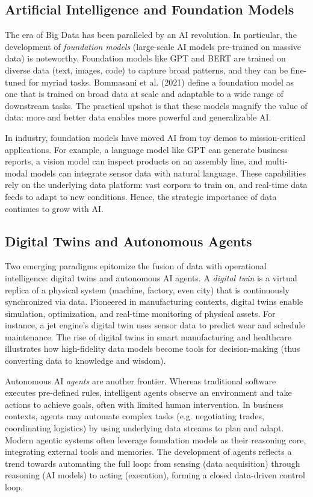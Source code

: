 \subsection{Artificial Intelligence and Foundation Models}
The era of Big Data has been paralleled by an AI revolution. In particular, the development of \emph{foundation models} (large-scale AI models pre-trained on massive data) is noteworthy. Foundation models like GPT and BERT are trained on diverse data (text, images, code) to capture broad patterns, and they can be fine-tuned for myriad tasks. Bommasani et al. (2021) define a foundation model as one that is trained on broad data at scale and adaptable to a wide range of downstream tasks. The practical upshot is that these models magnify the value of data: more and better data enables more powerful and generalizable AI.

In industry, foundation models have moved AI from toy demos to mission-critical applications. For example, a language model like GPT can generate business reports, a vision model can inspect products on an assembly line, and multi-modal models can integrate sensor data with natural language. These capabilities rely on the underlying data platform: vast corpora to train on, and real-time data feeds to adapt to new conditions. Hence, the strategic importance of data continues to grow with AI.

\subsection{Digital Twins and Autonomous Agents}
Two emerging paradigms epitomize the fusion of data with operational intelligence: digital twins and autonomous AI agents. A \emph{digital twin} is a virtual replica of a physical system (machine, factory, even city) that is continuously synchronized via data. Pioneered in manufacturing contexts, digital twins enable simulation, optimization, and real-time monitoring of physical assets. For instance, a jet engine’s digital twin uses sensor data to predict wear and schedule maintenance. The rise of digital twins in smart manufacturing and healthcare illustrates how high-fidelity data models become tools for decision-making (thus converting data to knowledge and wisdom).

Autonomous AI \emph{agents} are another frontier. Whereas traditional software executes pre-defined rules, intelligent agents observe an environment and take actions to achieve goals, often with limited human intervention. In business contexts, agents may automate complex tasks (e.g. negotiating trades, coordinating logistics) by using underlying data streams to plan and adapt. Modern agentic systems often leverage foundation models as their reasoning core, integrating external tools and memories. The development of agents reflects a trend towards automating the full loop: from sensing (data acquisition) through reasoning (AI models) to acting (execution), forming a closed data-driven control loop.


